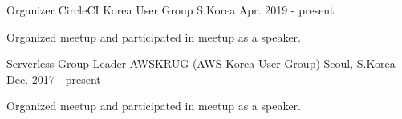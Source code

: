 

\begin{cventries}

  \cventry
    {Organizer} %
    {CircleCI Korea User Group} %
    {S.Korea} %
    {Apr. 2019 - present} %
    {
      \begin{cvitems} %
        \item {Organized meetup and participated in meetup as a speaker.}
      \end{cvitems}
    }
    
  \cventry
    {Serverless Group Leader} %
    {AWSKRUG (AWS Korea User Group)} %
    {Seoul, S.Korea} %
    {Dec. 2017 - present} %
    {
      \begin{cvitems} %
        \item {Organized meetup and participated in meetup as a speaker.}
      \end{cvitems}
    }
    

\end{cventries}
